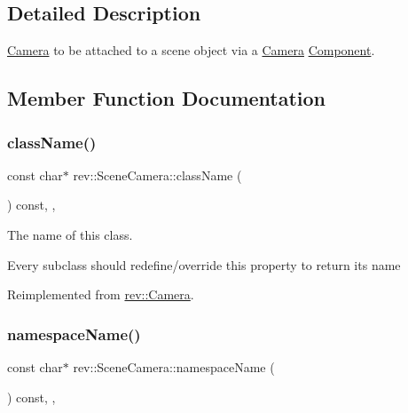 \subsection{Detailed Description}
\mbox{\hyperlink{classrev_1_1_camera}{Camera}} to be attached to a scene object via a \mbox{\hyperlink{classrev_1_1_camera}{Camera}} \mbox{\hyperlink{classrev_1_1_component}{Component}}. 

\subsection{Member Function Documentation}
\mbox{\label{classrev_1_1_scene_camera_a4fd93186927c55d2c4d48ebf941e248d}} 
\subsubsection{\texorpdfstring{className()}{className()}}
{\footnotesize\ttfamily const char$\ast$ rev\+::\+Scene\+Camera\+::class\+Name (\begin{DoxyParamCaption}{ }\end{DoxyParamCaption}) const\hspace{0.3cm}{\ttfamily [inline]}, {\ttfamily [override]}, {\ttfamily [virtual]}}



The name of this class. 

Every subclass should redefine/override this property to return its name 

Reimplemented from \mbox{\hyperlink{classrev_1_1_camera_afce9a32f0fcc9e0851d73aa37441c815}{rev\+::\+Camera}}.

\mbox{\label{classrev_1_1_scene_camera_a8d2a68f15a75323bd1d9a5d96c7a09bc}} 
\subsubsection{\texorpdfstring{namespaceName()}{namespaceName()}}
{\footnotesize\ttfamily const char$\ast$ rev\+::\+Scene\+Camera\+::namespace\+Name (\begin{DoxyParamCaption}{ }\end{DoxyParamCaption}) const\hspace{0.3cm}{\ttfamily [inline]}, {\ttfamily [override]}, {\ttfamily [virtual]}}



